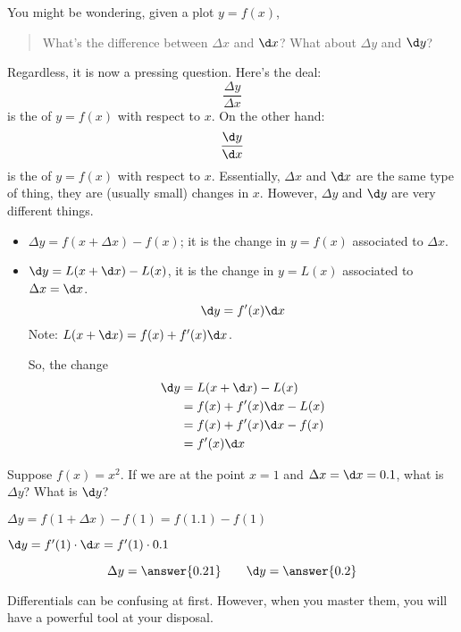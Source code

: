 \documentclass{ximera}
\begin{document}
You might be wondering, given a plot $y=f(x)$,
\begin{quote}
  What's the difference between $\Delta x$ and $\d x$? What about
  $\Delta y$ and $\d y$?
\end{quote}
Regardless, it is now a pressing question. Here's the deal: 
\[
\frac{\Delta y}{\Delta x}
\]
is the  of $y=f(x)$ with respect to $x$.
On the other hand:
\[
\frac{\d y}{\d x}
\]
is the  of $y=f(x)$ with respect to
$x$. Essentially, $\Delta x$ and $\d x$ are the same type of thing,
they are (usually small) changes in $x$. However, $\Delta y$ and $\d
y$ are very different things.
\begin{itemize}
\item $\Delta y=f(x+\Delta x)-f(x)$; it  is the change in $y=f(x)$ associated to $\Delta x$.
\item $\d y=L(x+\d x)-L(x)$, it is the change in $y=L(x)$ associated to $\Delta x=\d x$.
  \[
  \d y =f'(x)\d x
  \]
  Note: $ L(x+\d x)= f(x)+f'(x)\d x$.
   
  So, the change
  \begin{align*}
    \d y &= L(x+\d x)-L(x)\\
    &= f(x)+f'(x)\d x-L(x)\\
    &= f(x)+f'(x)\d x-f(x)\\
    &=f'(x)\d x
  \end{align*}
\end{itemize}
\begin{question}
  Suppose $f(x) = x^2$. If we are at the point $x=1$ and $\Delta x =\d x
  = 0.1$, what is $\Delta y$? What is $\d y$?
  \begin{hint}
 $ \Delta y=f(1+\Delta x)-f(1)=f(1.1)-f(1)$
    \end{hint}
      \begin{hint}
 $\d y=f'(1)\cdot\d x=f'(1)\cdot0.1$
    \end{hint}
  \begin{prompt}
    \[
    \Delta y = \answer{0.21}\qquad \d y = \answer{0.2}
    \]
  \end{prompt}
  
\end{question}
Differentials can be confusing at first. However, when you master
them, you will have a powerful tool at your disposal.
\end{document}
